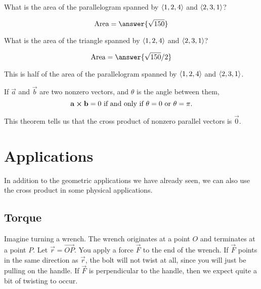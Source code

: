 \documentclass{ximera}
\begin{document}
\begin{question}
  What is the area of the parallelogram spanned by $\left\langle 1,2,4\right\rangle$ and $\left\langle 2,3,1\right\rangle$?
  \begin{prompt}
  \[
  \text{Area} = \answer{\sqrt{150}}
  \]
  \end{prompt}
  \begin{question}
    What is the area of the triangle spanned by $\left\langle 1,2,4\right\rangle$ and $\left\langle 2,3,1\right\rangle$?
    \begin{prompt}
    \[
    \text{Area} = \answer{\sqrt{150}/2}
    \]
    \end{prompt}
    \begin{hint}
      This is half of the area of the parallelogram spanned by $\left\langle 1,2,4\right\rangle$ and $\left\langle 2,3,1\right\rangle$.
    \end{hint}
  \end{question}
\end{question}



\begin{theorem}
  If $\vec{a}$ and $\vec{b}$ are two nonzero vectors, and $\theta$ is
  the angle between them,
  \[
  \mathbf{a}\boldsymbol\times \mathbf{b} = 0 \text{ if and only if $\theta=
  0$ or $\theta=\pi$}.
  \]
\end{theorem}

This theorem tells us that the cross product of nonzero parallel
vectors is $\vec{0}$.




\section{Applications}

In addition to the geometric applications we have already seen, we can
also use the cross product in some physical applications.



\subsection{Torque}

Imagine turning a wrench.  The wrench originates at a point $O$ and
terminates at a point $P$.  Let $\vec{r} = \overrightarrow{OP}$.  You
apply a force $\vec{F}$ to the end of the wrench.  If $\vec{F}$ points
in the same direction as $\vec{r}$, the bolt will not twist at all,
since you will just be pulling on the handle.  If $\vec{F}$ is
perpendicular to the handle, then we expect quite a bit of twisting to
occur.
\end{document}

